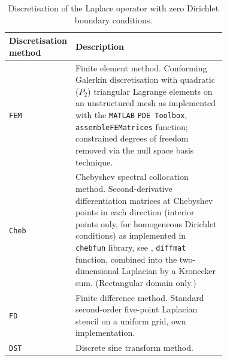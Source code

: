 %

\begin{table}
  \centering
  \begin{tabular}{l p{0.72\linewidth}}
    \toprule
    Discretisation method & Description \\
    \midrule
    \texttt{FEM} & Finite element method. Conforming Galerkin discretisation with quadratic ($P_2$) triangular Lagrange elements on an unstructured mesh as implemented with the \texttt{MATLAB} \texttt{PDE Toolbox}, \lstinline{assembleFEMatrices} function; constrained degrees of freedom removed via the null space basis technique. \\
    \texttt{Cheb} & Chebyshev spectral collocation method. Second-derivative differentiation matrices at Chebyshev points in each direction (interior points only, for homogeneous Dirichlet conditions) as implemented in \texttt{chebfun} library, see \cite{driscoll.ta.hale.n.ea:chebfun}, \lstinline{diffmat} function, combined into the two-dimensional Laplacian by a Kronecker sum. (Rectangular domain only.) \\
    \texttt{FD} & Finite difference method. Standard second-order five-point Laplacian stencil on a uniform grid, own implementation. \\
    \texttt{DST} & Discrete sine transform method. \\
    \bottomrule
  \end{tabular}
  \caption{Discretisation  of the Laplace operator with zero Dirichlet boundary conditions.}
  \label{tab:methods_description}
\end{table}
